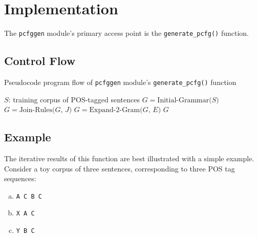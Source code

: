 \documentclass[paper=a4, fontsize=11pt]{scrartcl} %
\numberwithin{equation}{section} %
\numberwithin{figure}{section} %
\numberwithin{table}{section} %
\begin{document}

\section{Implementation}

The \texttt{pcfggen} module's primary access point is the \texttt{generate\_pcfg()} function.

\subsection{Control Flow}

\begin{algorithm}
\caption{Pseudocode program flow of \texttt{pcfggen} module's \texttt{generate\_pcfg()} function}
\begin{algorithmic}
 \Comment $S$: training corpus of POS-tagged sentences
\State $G = \text{Initial-Grammar($S$)}$
\Loop
{}
\State $G = \text{Join-Rules($G$, $J$)}$
\EndWhile
{}
\State $G = \text{Expand-2-Gram($G$, $E$)}$
\Else
\State \Return $G$
\EndIf
\EndLoop
\EndFunction
\end{algorithmic}
\end{algorithm}

\subsection{Example}

The iterative results of this function are best illustrated with a simple example. Consider a toy corpus of three sentences, corresponding to three POS tag sequences:

\begin{enumerate}[(a)]
\item \texttt{A C B C}
\item \texttt{X A C}
\item \texttt{Y B C}
\end{enumerate}
\end{document}
